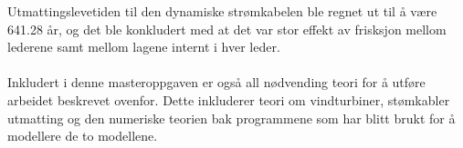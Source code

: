Utmattingslevetiden til den dynamiske strømkabelen ble regnet ut til å være 641.28 år, og det ble konkludert med at det var stor effekt av frisksjon mellom lederene samt mellom lagene internt i hver leder. \\\\
Inkludert i denne masteroppgaven er også all nødvending teori for å utføre arbeidet beskrevet ovenfor. Dette inkluderer teori om vindturbiner, stømkabler utmatting og den numeriske teorien bak programmene som har blitt brukt for å modellere de to modellene. 